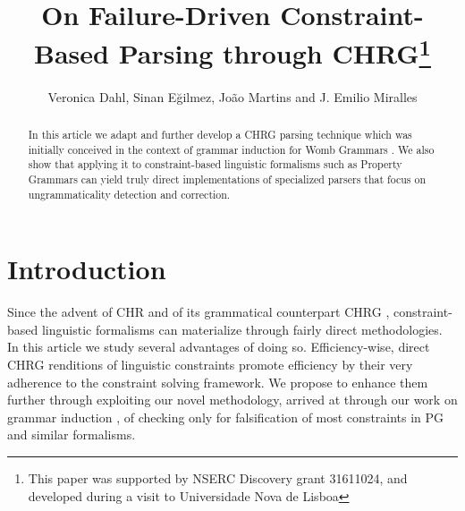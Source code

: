 \documentclass{llncs}
\begin{document}
%
%
\mainmatter              %
%
\title{On Failure-Driven Constraint-Based Parsing through CHRG\thanks{This paper was supported by NSERC  Discovery grant 31611024, and developed during a visit to Universidade Nova de Lisboa}}
%
%
\author{Veronica Dahl, Sinan Eğilmez, João Martins and J. Emilio Miralles}
%
%
%
\maketitle              %


\begin{abstract}

In this article we adapt and further develop  a CHRG parsing technique which was initially conceived in the context of grammar induction for Womb Grammars \cite{DM12}. We also show that applying it to constraint-based linguistic formalisms such as Property Grammars \cite{Blache} can yield truly direct implementations of specialized parsers that focus on ungrammaticality detection and correction.

\end{abstract}
%

\section{Introduction}
% 

Since the advent of CHR \cite{Fruhwirth98} and of its grammatical counterpart CHRG \cite{Christiansen01}, constraint-based linguistic formalisms can materialize through fairly direct meth\-odologies.   In this article we study several advantages of doing so. Efficiency-wise, direct CHRG renditions of linguistic constraints promote efficiency by their very adherence to  the constraint solving framework. We propose to enhance them further through exploiting our novel  methodology, arrived at through our work on grammar induction \cite{DM12}, of  checking only for falsification of most constraints in PG \cite{Blache} and similar formalisms.
%  
\end{document}

